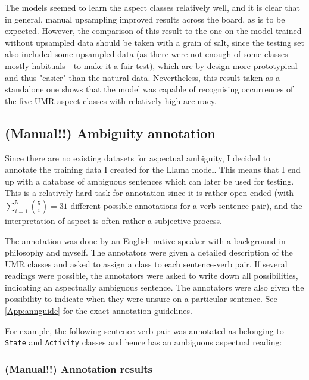 The models seemed to learn the aspect classes relatively well, and it is clear that in general, manual upsampling improved results across the board, as is to be expected. However, the comparison of this result to the one on the model trained without upsampled data should be taken with a grain of salt, since the testing set also included some upsampled data (as there were not enough of some classes - mostly habituals - to make it a fair test), which are by design more prototypical and thus "easier" than the natural data. Nevertheless, this result taken as a standalone one shows that the model was capable of recognising occurrences of the five UMR aspect classes with relatively high accuracy.

\subsection{(Manual!!) Ambiguity annotation}
Since there are no existing datasets for aspectual ambiguity, I decided to annotate the training data I created for the Llama model. This means that I end up with a database of ambiguous sentences which can later be used for testing. This is a relatively hard task for annotation since it is rather open-ended (with $\sum_{i=1}^{5} \binom{5}{i}=31$ different possible annotations for a verb-sentence pair), and the interpretation of aspect is often rather a subjective process.

The annotation was done by an English native-speaker with a background in philosophy and myself. The annotators were given a detailed description of the UMR classes and asked to assign a class to each sentence-verb pair. If several readings were possible, the annotators were asked to write down all possibilities, indicating an aspectually ambiguous sentence. The annotators were also given the possibility to indicate when they were unsure on a particular sentence. See \ref{App:annguide} for the exact annotation guidelines.

For example, the following sentence-verb pair was annotated as belonging to \texttt{State} and \texttt{Activity} classes and hence has an ambiguous aspectual reading:

\begin{exe}
\end{exe}
\label{ambigExampleSent}

\subsubsection{(Manual!!) Annotation results}

